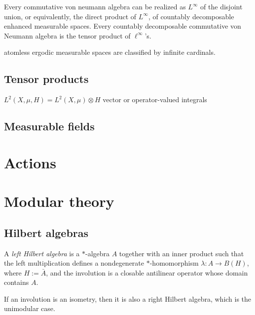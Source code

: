 \documentclass{../../large}
\begin{document}
Every commutative von neumann algebra can be realized as $L^\infty$ of the disjoint union, or equivalently, the direct product of $L^\infty$, of countably decomposable enhanced measurable spaces.
Every countably decomposable commutative von Neumann algebra is the tensor product of $\ell^\infty$'s.



atomless ergodic measurable spaces are classified by infinite cardinals.

\section{Tensor products}

$L^2(X,\mu,H)=L^2(X,\mu)\otimes H$
vector or operator-valued integrals

\section{Measurable fields}

\begin{prb}
\end{prb}

\begin{prb}
\end{prb}







\chapter{Actions}








\chapter{Modular theory}

\section{Hilbert algebras}



\begin{prb}
A \emph{left Hilbert algebra} is a $*$-algebra $A$ together with an inner product such that the left multiplication defines a nondegenerate $*$-homomorphism $\lambda:A\to B(H)$, where $H:=\bar A$, and the involution is a closable antilinear operator whose domain contains $A$.

If an involution is an isometry, then it is also a right Hilbert algebra, which is the unimodular case.

\end{prb}
\end{document}

